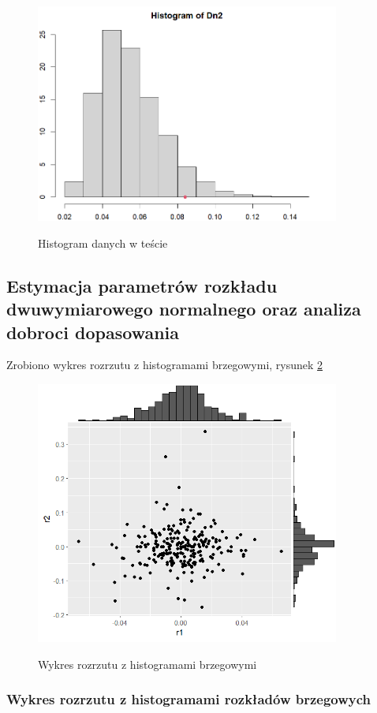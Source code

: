 \documentclass[a4paper,11pt]{article}
\begin{document}
\begin{figure}[htb]
	\centering
	\includegraphics[width=10cm]{jjb_histMC.png}
        \label{fig:jjb_histMC}
	\caption{Histogram danych w teście }
\end{figure}



\subsection{Estymacja parametrów rozkładu dwuwymiarowego normalnego oraz analiza dobroci dopasowania}

Zrobiono wykres rozrzutu z histogramami brzegowymi, rysunek \ref{fig:wykres_rozrzutu}

\begin{figure}[htb]
	\centering
	\includegraphics[width=10cm]{wykres_rozrzutu_histogram.png}
        \label{fig:wykres_rozrzutu}
	\caption{Wykres rozrzutu z histogramami brzegowymi}
\end{figure}

\subsubsection{Wykres rozrzutu z histogramami rozkładów brzegowych}
\end{document}
